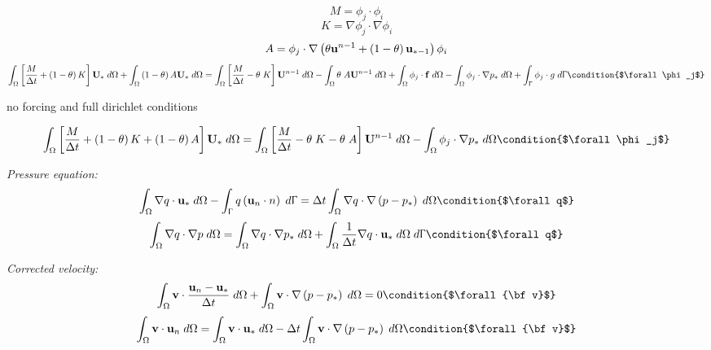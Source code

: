 \documentclass[11pt,a4paper]{article}
\begin{document}
\begin{dmath}
  M = \phi_j \cdot \phi_i 
\end{dmath}
\begin{dmath}
  K = \nabla \phi_j \cdot \nabla \phi_i
\end{dmath}
\begin{dmath}
  A = \phi_j \cdot \nabla \left( \theta {\bf u}^{n-1} + \left(1 - \theta \right) {\bf u}_{* - 1} \right) \phi_i
\end{dmath}
\begin{dmath}
  \int_\Omega \left [ \frac{M}{\Delta t} + \left(1 - \theta \right) K \right] {\bf U}_* \; d\Omega + \int_\Omega \left(1 - \theta \right) A {\bf U}_* \; d\Omega = \int_\Omega \left [ \frac{M}{\Delta t} - \theta \; K \right] {\bf U}^{n-1} \; d\Omega - \int_\Omega \theta \; A {\bf U}^{n-1} \; d\Omega + \int_\Omega \phi_j \cdot {\bf f} \; d\Omega - \int_\Omega \phi_j \cdot \nabla p_* \; d\Omega \\ + \int_\Upgamma \phi_j \cdot g \; d\Upgamma \condition{$\forall \phi_j$}
\end{dmath}

no forcing and full dirichlet conditions


\begin{dmath}
  \int_\Omega \left [ \frac{M}{\Delta t} + \left(1 - \theta \right) K + \left(1 - \theta \right) A \right] {\bf U}_* \; d\Omega = \int_\Omega \left [ \frac{M}{\Delta t} - \theta \; K - \theta \; A \right] {\bf U}^{n-1} \; d\Omega - \int_\Omega \phi_j \cdot \nabla p_* \; d\Omega \condition{$\forall \phi_j$}
\end{dmath}

\emph{Pressure equation:}
\begin{dmath}
  \int_\Omega \nabla q \cdot {\bf u}_* \; d\Omega - \int_\Upgamma q \left( {\bf u}_{n} \cdot n \right) \; d\Upgamma = \Delta t \int_\Omega \nabla q \cdot \nabla \left(p - p_* \right) \; d\Omega  \condition{$\forall q$}
\end{dmath}
\begin{dmath}
   \int_\Omega \nabla q \cdot \nabla p \; d\Omega = \int_\Omega \nabla q \cdot \nabla p_* \; d\Omega + \int_\Omega \frac{1}{\Delta t} \nabla q \cdot {\bf u}_* \; d\Omega \; d\Upgamma \condition{$\forall q$}
\end{dmath}

\emph{Corrected velocity:}
\begin{dmath}
  \int_\Omega {\bf v} \cdot \frac{{\bf u}_n - {\bf u}_*}{\Delta t} \; d\Omega + \int_\Omega {\bf v} \cdot \nabla \left(p - p_* \right) \; d\Omega = 0 \condition{$\forall {\bf v}$}
\end{dmath}
\begin{dmath}
  \int_\Omega {\bf v} \cdot {\bf u}_n \; d\Omega = \int_\Omega {\bf v} \cdot {\bf u}_* \; d\Omega - \Delta t \int_\Omega {\bf v} \cdot \nabla \left(p - p_* \right) \; d\Omega \condition{$\forall {\bf v}$}
\end{dmath}
\end{document}
